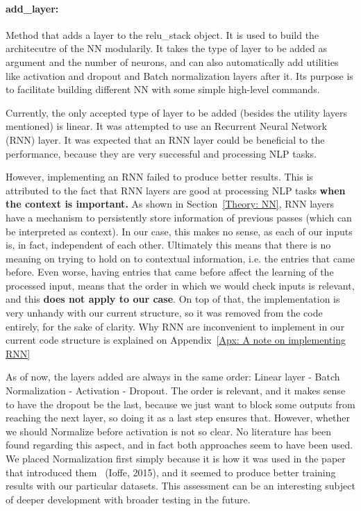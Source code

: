 \documentclass[a4paper, 11pt]{report}
\begin{document}
    \paragraph{add\_layer:} Method that adds a layer to the relu\_stack object. It is used to build the architecutre of the NN modularily. It takes the type of layer to be added as argument and the number of neurons, and can also automatically add utilities like activation and dropout and Batch normalization layers after it. Its purpose is to facilitate building different NN with some simple high-level commands.

    \begin{tcolorbox}[title=Failed Approach: Using RNN layer , colback=white,colframe=red!60!black]
    Currently, the only accepted type of layer to be added (besides the utility layers mentioned) is linear. It was attempted to use an Recurrent Neural Network (RNN) layer. It was expected that an RNN layer could be beneficial to the performance, because they are very successful and processing NLP tasks.

    However, implementing an RNN failed to produce better results. This is attributed to the fact that RNN layers are good at processing NLP tasks \textbf{when the context is important.} As shown in Section~\ref{Theory: NN}, RNN layers have a mechanism to persistently store information of previous passes (which can be interpreted as context). In our case, this makes no sense, as each of our inputs is, in fact, independent of each other. Ultimately this means that there is no meaning on trying to hold on to contextual information, i.e. the entries that came before. Even worse, having entries that came before affect the learning of the processed input, means that the order in which we would check inputs is relevant, and this \textbf{does not apply to our case}. On top of that, the implementation is very unhandy with our current structure, so it was removed from the code entirely, for the sake of clarity. Why RNN are inconvenient to implement in our current code structure is explained on Appendix~\ref{Apx: A note on implementing RNN}
    \end{tcolorbox}
    \begin{tcolorbox}[title=Future Development: More flexibility when adding layers, colback=white, colframe=green!40!black]
         As of now, the layers added are always in the same order: Linear layer - Batch Normalization - Activation - Dropout. The order is relevant, and it makes sense to have the dropout be the last, because we just want to block some outputs from reaching the next layer, so doing it as a last step ensures that. However, whether we should Normalize before activation is not so clear. No literature has been found regarding this aspect, and in fact both approaches seem to have been used. We placed Normalization first simply because it is how it was used in the paper that introduced them~\cite{ioffe2015batch} (Ioffe, 2015), and it seemed to produce better training results with our particular datasets. This assessment can be an interesting subject of deeper development with broader testing in the future.
    \end{tcolorbox}
\end{document}
